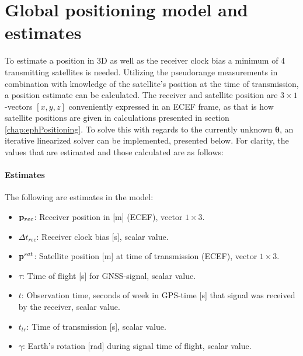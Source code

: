 \section{Global positioning model and estimates}
To estimate a position in 3D as well as the receiver clock bias a minimum of 4 transmitting satellites is needed. Utilizing the pseudorange measurements in combination with knowledge of the satellite's position at the time of transmission, a position estimate can be calculated. The receiver and satellite position are $3\times 1$-vectors $[x, y, z]$ conveniently expressed in an ECEF frame, as that is how satellite positions are given in calculations presented in section \ref{chap:ephPositioning}. To solve this with regards to the currently unknown $\boldsymbol \theta$, an iterative linearized solver can be implemented, presented below. For clarity, the values that are estimated and those calculated are as follows:

\paragraph{Estimates} The following are estimates in the model:
\begin{itemize}
\item ${\bf p}_{rec}$: Receiver position in [m] (ECEF), vector $1\times 3$.
\item $\Delta t_{rec}$: Receiver clock bias [s], scalar value.
\item ${\bf p}^{sat}$: Satellite position [m] at time of transmission (ECEF), vector $1\times 3$.
\item $\tau$: Time of flight [s] for GNSS-signal, scalar value.
\item $t$: Observation time, seconds of week in GPS-time [s] that signal was received by the receiver, scalar value.
\item $t_{tr}$: Time of transmission [s], scalar value.
\item $\gamma$: Earth's rotation [rad] during signal time of flight, scalar value.
\end{itemize}
